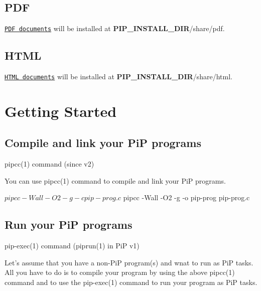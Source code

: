 \subsection*{P\-D\-F}

\href{doc/latex-inuse/libpip-manpages.pdf}{\tt P\-D\-F documents} will be installed at {\bfseries P\-I\-P\-\_\-\-I\-N\-S\-T\-A\-L\-L\-\_\-\-D\-I\-R}/share/pdf.

\subsection*{H\-T\-M\-L}

\href{doc/html/}{\tt H\-T\-M\-L documents} will be installed at {\bfseries P\-I\-P\-\_\-\-I\-N\-S\-T\-A\-L\-L\-\_\-\-D\-I\-R}/share/html.

\section*{Getting Started}

\subsection*{Compile and link your Pi\-P programs}


\begin{DoxyItemize}
\item pipcc(1) command (since v2)
\end{DoxyItemize}

You can use pipcc(1) command to compile and link your Pi\-P programs. \begin{DoxyVerb}$ pipcc -Wall -O2 -g -c pip-prog.c
$ pipcc -Wall -O2 -g -o pip-prog pip-prog.c
\end{DoxyVerb}


\subsection*{Run your Pi\-P programs}


\begin{DoxyItemize}
\item pip-\/exec(1) command (piprun(1) in Pi\-P v1)
\end{DoxyItemize}

Let's assume that you have a non-\/\-Pi\-P program(s) and wnat to run as Pi\-P tasks. All you have to do is to compile your program by using the above pipcc(1) command and to use the pip-\/exec(1) command to run your program as Pi\-P tasks. 


